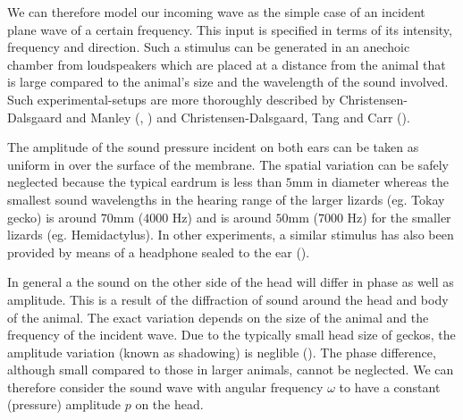 We can therefore model our incoming wave as the simple case of an incident plane wave of a 
certain frequency. This input is specified in terms of its intensity, frequency and direction.
Such a stimulus can be generated in an anechoic chamber from loudspeakers which are placed at
a distance from the animal that is large compared to the animal's size and the wavelength
of the sound involved. Such experimental-setups are more thoroughly described by 
Christensen-Dalsgaard and Manley (\cite{dalsgaardmanley1}, \cite{dalsgaardmanley2}) and 
Christensen-Dalsgaard, Tang and Carr (\cite{dalsgaardtangcarr}).

The amplitude of the sound pressure incident on both ears can be taken as uniform in over 
the surface of the membrane. The spatial variation can be safely neglected because the
typical eardrum is less than $5$mm in diameter whereas the smallest sound wavelengths
in the hearing range of the larger lizards (eg. Tokay gecko) is around $70$mm ($4000$ Hz) 
and is around $50$mm ($7000$ Hz) for the smaller lizards (eg. Hemidactylus). In other
experiments, a similar stimulus has also been provided by means of a headphone sealed
to the ear (\cite{koepplcarr1}).

In general a the sound on the other side of the head will differ in phase as well as amplitude. This is a result of the diffraction of 
sound around the head and body of the animal. The exact variation depends on the size of the animal and the frequency of the
incident wave. Due to the typically small head size of geckos, the amplitude variation 
(known as shadowing) is neglible (\cite{michelsenlarsen}). The phase difference, although small compared to those in larger animals, 
cannot be neglected. We can therefore consider the sound wave with angular frequency $\omega$ to have a constant (pressure) amplitude $p$
on the head.

